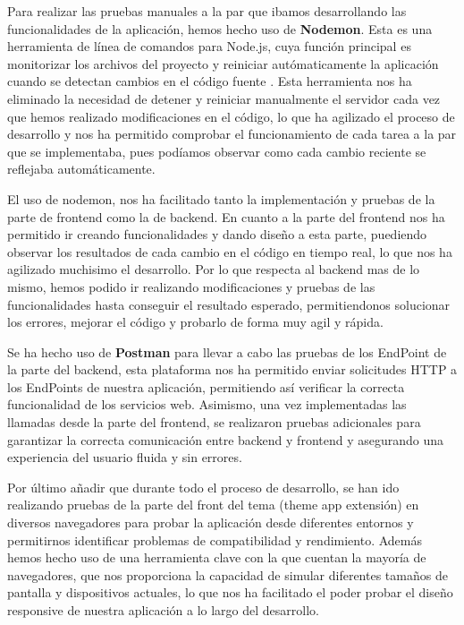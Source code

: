 \documentclass[12pt]{article}
\begin{document}
Para realizar las pruebas manuales a la par que ibamos desarrollando las funcionalidades de la aplicación, hemos hecho uso de \textbf{Nodemon}. 
Esta es una herramienta de línea de comandos para Node.js, cuya función principal es monitorizar los archivos del proyecto y reiniciar autómaticamente
la aplicación cuando se detectan cambios en el código fuente \cite{nodemon}. 
Esta herramienta nos ha eliminado la necesidad de detener y reiniciar manualmente el servidor cada vez que hemos realizado modificaciones en el código, 
lo que ha agilizado el proceso de desarrollo y nos ha permitido comprobar el funcionamiento de cada tarea a la par que se implementaba, pues podíamos observar como
cada cambio reciente se reflejaba automáticamente.

El uso de nodemon, nos ha facilitado tanto la implementación y pruebas de la parte de frontend como la de backend. En cuanto a la parte del frontend
nos ha permitido ir creando funcionalidades y dando diseño a esta parte, puediendo observar los resultados de cada cambio en el código en tiempo real,
lo que nos ha agilizado muchisimo el desarrollo. Por lo que respecta al backend mas de lo mismo, hemos podido ir realizando modificaciones y pruebas de las funcionalidades
hasta conseguir el resultado esperado, permitiendonos solucionar los errores, mejorar el código y probarlo de forma muy agil y rápida. 

Se ha hecho uso de \textbf{Postman} para llevar a cabo las pruebas de los EndPoint de la parte del backend, esta plataforma nos ha permitido enviar 
solicitudes HTTP a los EndPoints de nuestra aplicación, permitiendo así verificar la correcta funcionalidad de los servicios web. Asimismo, una vez implementadas
las llamadas desde la parte del frontend, se realizaron pruebas adicionales para garantizar la correcta comunicación entre backend y frontend y asegurando una
experiencia del usuario fluida y sin errores.

Por último añadir que durante todo el proceso de desarrollo, se han ido realizando pruebas de la parte del front del tema (theme app extensión) en diversos
navegadores para probar la aplicación desde diferentes entornos y permitirnos identificar problemas de compatibilidad y rendimiento.
Además hemos hecho uso de una herramienta clave con la que cuentan la mayoría de navegadores, que nos proporciona la capacidad de simular diferentes 
tamaños de pantalla y dispositivos actuales, lo que nos ha facilitado el poder probar el diseño responsive de nuestra aplicación a lo largo del desarrollo.
\end{document}
